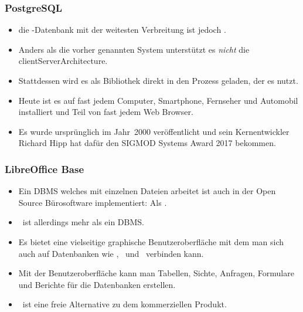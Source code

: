 \documentclass[aspectratio=169,mathserif,notheorems]{beamer}%
\begin{document}
\begin{frame}[t]%
\frametitle{PostgreSQL}%
\begin{itemize}%
\item die -Datenbank mit der weitesten Verbreitung ist jedoch \sqlite\cite{WB2019RHSOOS,GPBHKP2022SPPAF,C20245YOQ,HWACIS:HO2023WKUOS}.%
\item<2-> Anders als die vorher genannten System unterstützt es \emph{nicht} die \gls{clientServerArchitecture}.%
\item<3-> Stattdessen wird es als Bibliothek direkt in den Prozess geladen, der es nutzt.%
\item<4-> Heute ist es auf fast jedem Computer, Smartphone, Fernseher und Automobil installiert und Teil von fast jedem Web Browser.%
\item<5-> Es wurde ursprünglich im Jahr~2000 veröffentlicht und sein Kernentwickler Richard Hipp hat dafür den SIGMOD Systems Award 2017 bekommen\cite{C20245YOQ}.%
\end{itemize}%
%
%
\end{frame}%
%
\begin{frame}[t]%
\frametitle{LibreOffice Base}%
\begin{itemize}%
\item Ein DBMS welches mit einzelnen Dateien arbeitet ist auch in der Open Source Bürosoftware \libreoffice\cite{DF2024LTDF,GL2012LTSOOSSCBAFACSOL,S2022L7PFEUU} implementiert: Als \libreofficeBase\cite{FNFHWSKLSSGLFRSRPLJG2022BG7R1BOL7C,S2022L7PFEUU}.%
\item<2-> \libreofficeBase\ ist allerdings mehr als ein DBMS.%
\item<3-> Es bietet eine vielseitige graphische Benutzeroberfläche mit dem man sich auch auf Datenbanken wie \mysql, \mariadb\ und \postgresql\ verbinden kann.%
\item<4-> Mit der Benutzeroberfläche kann man Tabellen, Sichte, Anfragen, Formulare und Berichte für die Datenbanken erstellen.%
\item<5-> \libreofficeBase\ ist eine freie Alternative zu dem kommerziellen Produkt\microsoftAccess\cite{SSI2023MA2BTA,B2020HOMA2,UC2021AFD}.%
\end{itemize}%
%
%
\end{frame}%
%
\end{document}
